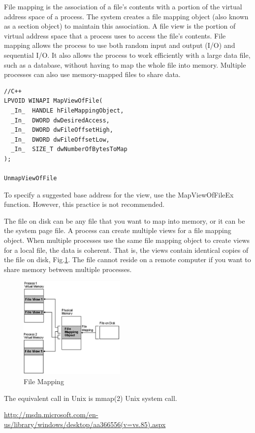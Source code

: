File mapping is the association of a file's contents with a portion of the
virtual address space of a process. The system creates a file mapping object
(also known as a section object) to maintain this association. A file view is
the portion of virtual address space that a process uses to access the file's
contents. File mapping allows the process to use both random input and output
(I/O) and sequential I/O. It also allows the process to work efficiently with a
large data file, such as a database, without having to map the whole file into
memory. Multiple processes can also use memory-mapped files to share data.    

\begin{Verbatim}
//C++
LPVOID WINAPI MapViewOfFile(
  _In_  HANDLE hFileMappingObject,
  _In_  DWORD dwDesiredAccess,
  _In_  DWORD dwFileOffsetHigh,
  _In_  DWORD dwFileOffsetLow,
  _In_  SIZE_T dwNumberOfBytesToMap
);

UnmapViewOfFile
\end{Verbatim}
To specify a suggested base address for the view, use the MapViewOfFileEx
function. However, this practice is not recommended.

The file on disk can be any file that you want to map into memory, or it can be
   the system page file. A process can create multiple views for a file mapping
   object. When multiple processes use the same file mapping object to create
   views for a local file, the data is coherent. That is, the views contain
   identical copies of the file on disk, Fig.\ref{fig:FileMapping}. The file
   cannot reside on a remote computer if you want to share memory between multiple processes.  
   
\begin{figure}[hbt]
  \centerline{\includegraphics[height=5cm,
    angle=0]{./images/FileMapping.eps}}
  \caption{File Mapping}
\label{fig:FileMapping}
\end{figure}

The equivalent call in Unix is  mmap(2) Unix system call.   

\url{http://msdn.microsoft.com/en-us/library/windows/desktop/aa366556(v=vs.85).aspx}
